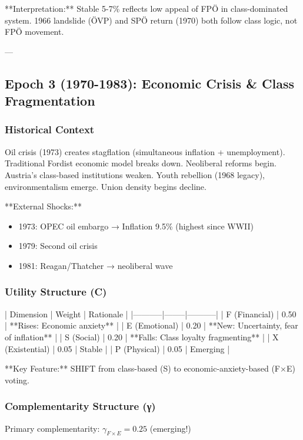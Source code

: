 **Interpretation:** Stable 5-7\% reflects low appeal of FPÖ in class-dominated system. 1966 landslide (ÖVP) and SPÖ return (1970) both follow class logic, not FPÖ movement.

---

\subsection{Epoch 3 (1970-1983): Economic Crisis \& Class Fragmentation}

\subsubsection{Historical Context}

Oil crisis (1973) creates stagflation (simultaneous inflation + unemployment). Traditional Fordist economic model breaks down. Neoliberal reforms begin. Austria's class-based institutions weaken. Youth rebellion (1968 legacy), environmentalism emerge. Union density begins decline.

**External Shocks:**
\begin{itemize}
\item 1973: OPEC oil embargo → Inflation 9.5\% (highest since WWII)
\item 1979: Second oil crisis
\item 1981: Reagan/Thatcher → neoliberal wave
\end{itemize}

\subsubsection{Utility Structure (C)}

| Dimension | Weight | Rationale |
|-----------|--------|-----------|
| F (Financial) | 0.50 | **Rises: Economic anxiety** |
| E (Emotional) | 0.20 | **New: Uncertainty, fear of inflation** |
| S (Social) | 0.20 | **Falls: Class loyalty fragmenting** |
| X (Existential) | 0.05 | Stable |
| P (Physical) | 0.05 | Emerging |

**Key Feature:** SHIFT from class-based (S) to economic-anxiety-based (F×E) voting.

\subsubsection{Complementarity Structure (γ)}

Primary complementarity: $\gamma_{F \times E} = 0.25$ (emerging!)

